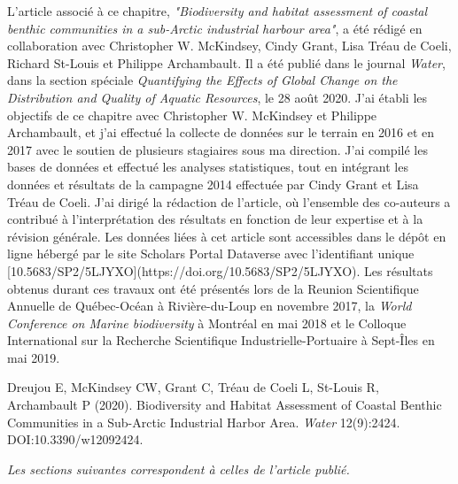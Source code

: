 L'article associé à ce chapitre, \textit{"Biodiversity and habitat assessment of coastal benthic communities in a sub-Arctic industrial harbour area"}, a été rédigé en collaboration avec Christopher W. McKindsey, Cindy Grant, Lisa Tréau de Coeli, Richard St-Louis et Philippe Archambault. Il a été publié dans le journal \textit{Water}, dans la section spéciale \textit{Quantifying the Effects of Global Change on the Distribution and Quality of Aquatic Resources}, le 28 août 2020. J'ai établi les objectifs de ce chapitre avec Christopher W. McKindsey et Philippe Archambault, et j'ai effectué la collecte de données sur le terrain en 2016 et en 2017 avec le soutien de plusieurs stagiaires sous ma direction. J'ai compilé les bases de données et effectué les analyses statistiques, tout en intégrant les données et résultats de la campagne 2014 effectuée par Cindy Grant et Lisa Tréau de Coeli. J'ai dirigé la rédaction de l'article, où l'ensemble des co-auteurs a contribué à l'interprétation des résultats en fonction de leur expertise et à la révision générale. Les données liées à cet article sont accessibles dans le dépôt en ligne hébergé par le site Scholars Portal Dataverse avec l'identifiant unique [10.5683/SP2/5LJYXO](https://doi.org/10.5683/SP2/5LJYXO). Les résultats obtenus durant ces travaux ont été présentés lors de la Reunion Scientifique Annuelle de Québec-Océan à Rivière-du-Loup en novembre 2017, la \textit{World Conference on Marine biodiversity} à Montréal en mai 2018 et le Colloque International sur la Recherche Scientifique Industrielle-Portuaire à Sept-Îles en mai 2019.
\linebreak[4]

\begin{singlespace}
Dreujou E, McKindsey CW, Grant C, Tréau de Coeli L, St-Louis R, Archambault P (2020). Biodiversity and Habitat Assessment of Coastal Benthic Communities in a Sub-Arctic Industrial Harbor Area. \textit{Water} 12(9):2424. DOI:10.3390/w12092424.
\end{singlespace}

\textit{Les sections suivantes correspondent à celles de l’article publié.}
